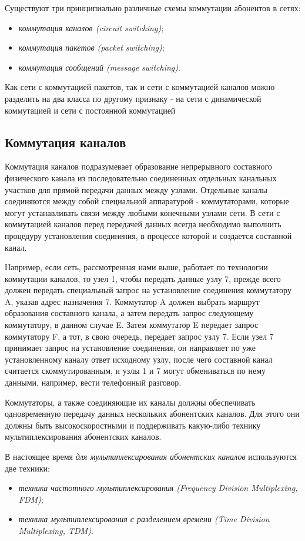 Существуют три принципиально различные схемы коммутации абонентов в сетях:
\begin{itemize}
    \item \emph{коммутация каналов (circuit switching)};
    \item \emph{коммутация пакетов (packet switching)};
    \item \emph{коммутация сообщений (message switching)}.
\end{itemize}

Как сети с коммутацией пакетов, так и сети с коммутацией каналов можно разделить на два класса по другому признаку - на сети с динамической коммутацией и сети с постоянной коммутацией

\subsection{Коммутация каналов}

Коммутация каналов подразумевает образование непрерывного составного физического канала из последовательно соединенных отдельных канальных участков для прямой передачи данных между узлами.
Отдельные каналы соединяются между собой специальной аппаратурой - коммутаторами, которые могут устанавливать связи между любыми конечными узлами сети.
В сети с коммутацией каналов перед передачей данных всегда необходимо выполнить процедуру установления соединения, в процессе которой и создается составной канал.

Например, если сеть, рассмотренная нами выше, работает по технологии коммутации каналов, то узел 1, чтобы передать данные узлу 7, прежде всего должен передать специальный запрос на установление соединения коммутатору A, указав адрес назначения 7.
Коммутатор A должен выбрать маршрут образования составного канала, а затем передать запрос следующему коммутатору, в данном случае E.
Затем коммутатор E передает запрос коммутатору F, а тот, в свою очередь, передает запрос узлу 7.
Если узел 7 принимает запрос на установление соединения, он направляет по уже установленному каналу ответ исходному узлу, после чего составной канал считается скоммутированным, и узлы 1 и 7 могут обмениваться по нему данными, например, вести телефонный разговор.

Коммутаторы, а также соединяющие их каналы должны обеспечивать одновременную передачу данных нескольких абонентских каналов.
Для этого они должны быть высокоскоростными и поддерживать какую-либо технику мультиплексирования абонентских каналов.

В настоящее время \emph{для мультиплексирования абонентских каналов} используются две техники:
\begin{itemize}
    \item \emph{техника частотного мультиплексирования (Frequency Division Multiplexing, FDM)};
    \item \emph{техника мультиплексирования с разделением времени (Time Division Multiplexing, TDM)}.
\end{itemize}

